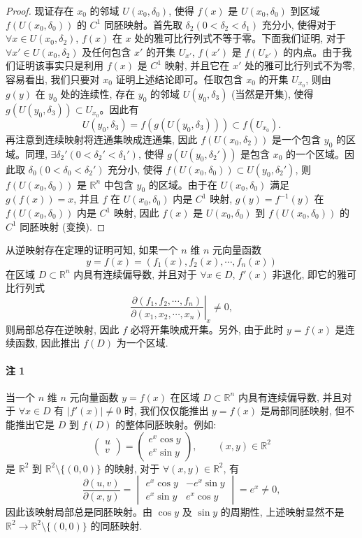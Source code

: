 \begin{proof}
现证存在 $x_0$ 的邻域 $U(x_0,\delta_0)$, 使得 $f(x)$ 是 $U(x_0,\delta_0)$ 到区域 $f(U(x_0,\delta_0))$ 的 $C^1$ 同胚映射。首先取 $\delta_2(0<\delta_2<\delta_1)$ 充分小, 使得对于 $\forall x\in U(x_0,\delta_2)$, $f(x)$ 在 $x$ 处的雅可比行列式不等于零。下面我们证明, 对于 $\forall x'\in U(x_0,\delta_2)$ 及任何包含 $x'$ 的开集 $U_{x'}$, $f(x')$ 是 $f(U_{x'})$ 的内点。由于我们证明该事实只是利用 $f(x)$ 是 $C^1$ 映射, 并且它在 $x'$ 处的雅可比行列式不为零, 容易看出, 我们只要对 $x_0$ 证明上述结论即可。任取包含 $x_0$ 的开集 $U_{x_0}$, 则由 $g(y)$ 在 $y_0$ 处的连续性, 存在 $y_0$ 的邻域 $U(y_0,\delta_3)$ (当然是开集), 使得 $g(U(y_0,\delta_3))\subset U_{x_0}$。因此有
\[
  U(y_0,\delta_3)=f(g(U(y_0,\delta_3)))\subset f(U_{x_0}).
\]
再注意到连续映射将连通集映成连通集, 因此 $f(U(x_0,\delta_2))$ 是一个包含 $y_0$ 的区域。同理, $\exists\delta_2'(0<\delta_2'<\delta_1')$, 使得 $g(U(y_0,\delta_2'))$ 是包含 $x_0$ 的一个区域。因此取 $\delta_0(0<\delta_0<\delta_2')$ 充分小, 使得 $f(U(x_0,\delta_0))\subset U(y_0,\delta_2')$, 则 $f(U(x_0,\delta_0))$ 是 $\mathbb R^n$ 中包含 $y_0$ 的区域。由于在 $U(x_0,\delta_0)$ 满足 $g(f(x))=x$, 并且 $f$ 在 $U(x_0,\delta_0)$ 内是 $C^1$ 映射, $g(y)=f^{-1}(y)$ 在 $f(U(x_0,\delta_0))$ 内是 $C^1$ 映射, 因此 $f(x)$ 是 $U(x_0,\delta_0)$ 到 $f(U(x_0,\delta_0))$ 的 $C^1$ 同胚映射 (变换).
\end{proof}


从逆映射存在定理的证明可知, 如果一个 $n$ 维 $n$ 元向量函数
\[
  y=f(x)=(f_1(x),f_2(x),\cdots,f_n(x))
\]
在区域 $D\subset\mathbb R^n$ 内具有连续偏导数, 并且对于 $\forall x\in D$, $f'(x)$ 非退化, 即它的雅可比行列式
\[
  \left.
  \frac{\partial(f_1,f_2,\cdots,f_n)}
       {\partial(x_1,x_2,\cdots,x_n)}
  \right|_x
  \ne0,
\]
则局部总存在逆映射, 因此 $f$ 必将开集映成开集。另外, 由于此时 $y=f(x)$ 是连续函数, 因此推出 $f(D)$ 为一个区域.

\paragraph*{注 1}
当一个 $n$ 维 $n$ 元向量函数 $y=f(x)$ 在区域 $D\subset\mathbb R^n$ 内具有连续偏导数, 并且对于 $\forall x\in D$ 有 $|f'(x)|\ne0$ 时, 我们仅仅能推出 $y=f(x)$ 是局部同胚映射, 但不能推出它是 $D$ 到 $f(D)$ 的整体同胚映射。例如:
\[
  \begin{pmatrix}
    u\\
    v
  \end{pmatrix}
  =
  \begin{pmatrix}
    e^x\cos y\\
    e^x\sin y
  \end{pmatrix},
  \qquad (x,y)\in\mathbb R^2
\]
是 $\mathbb R^2$ 到 $\mathbb R^2\setminus\{(0,0)\}$ 的映射, 对于 $\forall(x,y)\in\mathbb R^2$, 有
\[
  \frac{\partial(u,v)}{\partial(x,y)}
  =
  \begin{vmatrix}
    e^x\cos y & -e^x\sin y\\
    e^x\sin y & e^x\cos y
  \end{vmatrix}
  =e^x\ne0,
\]
因此该映射局部总是同胚映射。由 $\cos y$ 及 $\sin y$ 的周期性, 上述映射显然不是 $\mathbb R^2\to\mathbb R^2\setminus\{(0,0)\}$ 的同胚映射.

